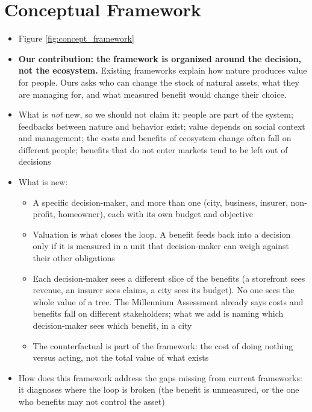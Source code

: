 \documentclass[12pt]{article}
\begin{document}
\section{Conceptual Framework}\label{sec:CF}
\begin{itemize}
  \item Figure \ref{fig:concept_framework}
  \item \textbf{Our contribution: the framework is organized around the decision, not the ecosystem.} Existing frameworks explain how nature produces value for people. Ours asks who can change the stock of natural assets, what they are managing for, and what measured benefit would change their choice.
  \item What is \textit{not} new, so we should not claim it: people are part of the system; feedbacks between nature and behavior exist; value depends on social context and management; the costs and benefits of ecosystem change often fall on different people; benefits that do not enter markets tend to be left out of decisions \citep{millenniumecosystemassessmentEcosystemsHumanWellbeing2005, tanConceptualFrameworkUntangle2020, fenichelNaturalCapitalMetaphor2014, mcphearsonGlobalSynthesisRegional2025, keelerSocialecologicalTechnologicalFactors2019}
  \item What is new:
  \begin{itemize}
    \item A specific decision-maker, and more than one (city, business, insurer, non-profit, homeowner), each with its own budget and objective
    \item Valuation is what closes the loop. A benefit feeds back into a decision only if it is measured in a unit that decision-maker can weigh against their other obligations
    \item Each decision-maker sees a different slice of the benefits (a storefront sees revenue, an insurer sees claims, a city sees its budget). No one sees the whole value of a tree. The Millennium Assessment already says costs and benefits fall on different stakeholders; what we add is naming which decision-maker sees which benefit, in a city
    \item The counterfactual is part of the framework: the cost of doing nothing versus acting, not the total value of what exists
  \end{itemize}
  \item How does this framework address the gaps missing from current frameworks: it diagnoses where the loop is broken (the benefit is unmeasured, or the one who benefits may not control the asset)
\end{itemize}
\end{document}
